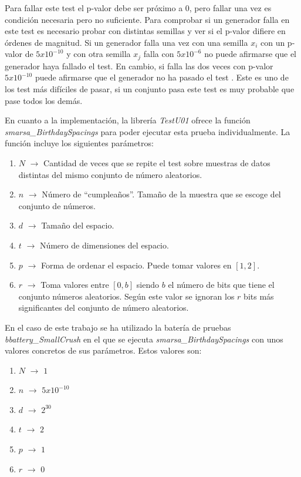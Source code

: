 \documentclass{article}
\begin{document}
Para fallar este test el p-valor debe ser próximo a $0$, pero fallar una vez es condición necesaria pero no suficiente. Para comprobar si un generador falla en este test es necesario probar con distintas semillas y ver si el p-valor difiere en órdenes de magnitud. Si un generador falla una vez con una semilla $x_i$ con un p-valor de $5x10^{-10}$ y con otra semilla $x_j$ falla con $5x10^{-6}$ no puede afirmarse que el generador haya fallado el test. En cambio, si falla las dos veces con p-valor $5x10^{-10}$ puede afirmarse que el generador no ha pasado el test \citet{mccullough_2006}. Este es uno de los test más difíciles de pasar, si un conjunto pasa este test es muy probable que pase todos los demás. 

En cuanto a la implementación, la librería \emph{TestU01} ofrece la función \textit{smarsa\_BirthdaySpacings} para poder ejecutar esta prueba individualmente. La función incluye los siguientes parámetros: 
\begin{enumerate}
    \item[] $N$ $\rightarrow$ Cantidad de veces que se repite el test sobre muestras de datos distintas del mismo conjunto de número aleatorios. 
    \item[] $n$ $\rightarrow$ Número de “cumpleaños”. Tamaño de la muestra que se escoge del conjunto de números. 
    \item[] $d$ $\rightarrow$ Tamaño del espacio. 
    \item[] $t$ $\rightarrow$ Número de dimensiones del espacio. 
    \item[] $p$ $\rightarrow$ Forma de ordenar el espacio. Puede tomar valores en $[1,2]$. 
    \item[] $r$ $\rightarrow$ Toma valores entre $[0,b]$ siendo $b$ el número de bits que tiene el conjunto números aleatorios. Según este valor se ignoran los $r$ bits más significantes del conjunto de número aleatorios. 
\end{enumerate}

En el caso de este trabajo se ha utilizado la batería de pruebas \textit{bbattery\_SmallCrush} en el que se ejecuta \textit{smarsa\_BirthdaySpacings} con unos valores concretos de sus parámetros. Estos valores son: 

\begin{enumerate}
    \item[] $N$ $\rightarrow$ $1$
    \item[] $n$ $\rightarrow$ $5x10^{-10}$
    \item[] $d$ $\rightarrow$ $2^{30}$
    \item[] $t$ $\rightarrow$ $2$
    \item[] $p$ $\rightarrow$ $1$
    \item[] $r$ $\rightarrow$ $0$
\end{enumerate}
\end{document}
